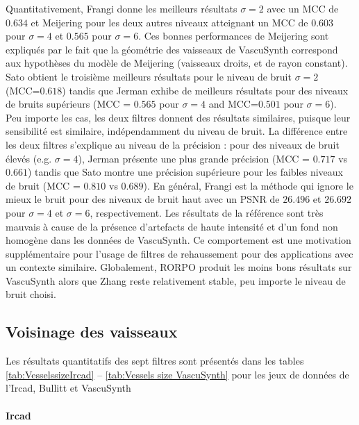 Quantitativement, Frangi donne les meilleurs résultats $\sigma=2$ avec un MCC de $0.634$ et Meijering pour les deux autres niveaux atteignant un MCC de $0.603$ pour $\sigma=4$ et $0.565$ pour $\sigma=6$. Ces bonnes performances de Meijering sont expliqués par le fait que la géométrie des vaisseaux de VascuSynth correspond aux hypothèses du modèle de Meijering (vaisseaux droits, et de rayon constant). Sato obtient le troisième meilleurs résultats pour le niveau de bruit $\sigma=2$ (MCC=$0.618$) tandis que Jerman exhibe de meilleurs résultats pour des niveaux de bruits supérieurs (MCC = $0.565$ pour $\sigma=4$ and MCC=$0.501$ pour $\sigma = 6$). Peu importe les cas, les deux filtres donnent des résultats similaires, puisque leur sensibilité est similaire, indépendamment du niveau de bruit. La différence entre les deux filtres s'explique au niveau de la précision : pour des niveaux de bruit élevés (e.g. $\sigma=4$), Jerman présente une plus grande précision (MCC = $0.717$ vs $0.661$) tandis que Sato montre une précision supérieure pour les faibles niveaux de bruit (MCC = $0.810$ vs $0.689$). En général, Frangi est la méthode qui ignore le mieux le bruit pour des niveaux de bruit haut avec un PSNR de $26.496$ et $26.692$ pour $\sigma=4$ et $\sigma=6$, respectivement. Les résultats de la référence sont très mauvais à cause de la présence d'artefacts de haute intensité et d'un fond non homogène dans les données de VascuSynth. Ce comportement est une motivation supplémentaire pour l'usage de filtres de rehaussement pour des applications avec un contexte similaire. Globalement, RORPO produit les moins bons résultats sur VascuSynth alors que Zhang reste relativement stable, peu importe le niveau de bruit choisi.

\subsection{Voisinage des vaisseaux}
Les résultats quantitatifs des sept filtres sont présentés dans les tables \ref{tab:VesselssizeIrcad} -- \ref{tab:Vessels size VascuSynth} pour les jeux de données de l'Ircad, Bullitt et VascuSynth 

\paragraph{Ircad}

